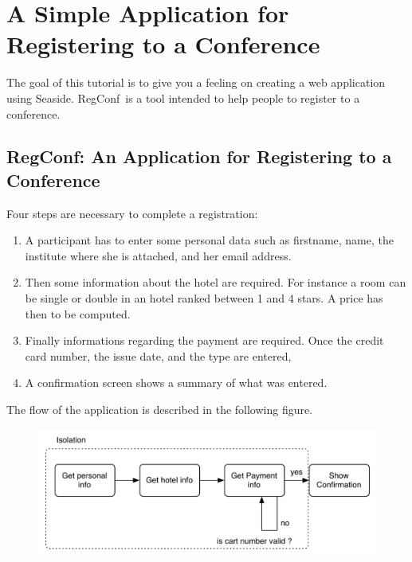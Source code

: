 \ifx\wholebook\relax\else


\fi



\newcommand{\job}[1]{\vspace{7 pt}\noindent \textbf{Your job:}~#1 \vspace{7 pt}}
\newcommand{\regconf}{RegConf}

\chapter{A Simple Application for Registering to a Conference}
\mainauthor{\bergel}


The goal of this tutorial is to give you a feeling on creating a web application using Seaside. \regconf~is  a tool intended to help people to register to a conference. 

\section{RegConf: An Application for Registering to a Conference}


Four steps are necessary to complete a registration:
\begin{enumerate}
\item A participant has to enter some personal data such as firstname, name, the institute where she is attached, and her email address.
\item Then some information about the hotel are required. For instance a room can be single or double in an hotel ranked between 1 and 4 stars. A price has then to be computed.
\item Finally informations regarding the payment are required. Once the credit card number, the issue date, and the type are entered,
\item A confirmation screen shows a summary of what was entered.
\end{enumerate}



The flow of the application is described in the following figure.

\begin{figure}
\includegraphics[scale=0.7]{flow}
\caption{}
\end{figure}

